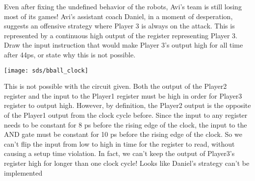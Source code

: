 \begin{blocksection}

\question
Even after fixing the undefined behavior of the robots, Avi's team is still losing most of its games! Avi's assistant coach Daniel, in a moment of desperation, suggests an offensive strategy where Player 3 is always on the attack. This is represented by a continuous high output of the register representing Player 3. Draw the input instruction that would make Player 3's output high for all time after 44ps, or state why this is not possible.

\texttt{[image: sds/bball\_clock]}

\begin{solution}
This is not possible with the circuit given. Both the output of the Player2 register and the input to the Player1 register must be high in order for Player3 register to output high. 
However, by definition, the Player2 output is the opposite of the Player1 output from the clock cycle before. 
Since the input to any register needs to be constant for 8 ps before the rising edge of the clock, the input to the AND gate must be constant for 10 ps before the rising edge of the clock. 
So we can’t flip the input from low to high in time for the register to read, without causing a setup time violation. In fact, we can’t keep the output of Player3’s register high for longer than one clock cycle! Looks like Daniel's strategy can't be implemented
\end{solution}

\end{blocksection}